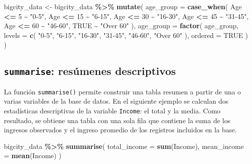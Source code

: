 \documentclass[
  spanish,
  12pt,
]{book}
\newenvironment{Shaded}{\begin{snugshade}}{\end{snugshade}}
\newcommand{\AttributeTok}[1]{\textcolor[rgb]{0.13,0.29,0.53}{#1}}
\newcommand{\ConstantTok}[1]{\textcolor[rgb]{0.56,0.35,0.01}{#1}}
\newcommand{\DecValTok}[1]{\textcolor[rgb]{0.00,0.00,0.81}{#1}}
\newcommand{\FunctionTok}[1]{\textcolor[rgb]{0.13,0.29,0.53}{\textbf{#1}}}
\newcommand{\NormalTok}[1]{#1}
\newcommand{\OtherTok}[1]{\textcolor[rgb]{0.56,0.35,0.01}{#1}}
\newcommand{\SpecialCharTok}[1]{\textcolor[rgb]{0.81,0.36,0.00}{\textbf{#1}}}
\newcommand{\StringTok}[1]{\textcolor[rgb]{0.31,0.60,0.02}{#1}}
\begin{document}
\begin{Shaded}
\begin{Highlighting}[]
\NormalTok{bigcity\_data }\OtherTok{\textless{}{-}}\NormalTok{ bigcity\_data }\SpecialCharTok{\%\textgreater{}\%}
  \FunctionTok{mutate}\NormalTok{(}
    \AttributeTok{age\_group =} \FunctionTok{case\_when}\NormalTok{(}
\NormalTok{      Age }\SpecialCharTok{\textless{}=} \DecValTok{5} \SpecialCharTok{\textasciitilde{}} \StringTok{"0{-}5"}\NormalTok{,}
\NormalTok{      Age }\SpecialCharTok{\textless{}=} \DecValTok{15} \SpecialCharTok{\textasciitilde{}} \StringTok{"6{-}15"}\NormalTok{,}
\NormalTok{      Age }\SpecialCharTok{\textless{}=} \DecValTok{30} \SpecialCharTok{\textasciitilde{}} \StringTok{"16{-}30"}\NormalTok{,}
\NormalTok{      Age }\SpecialCharTok{\textless{}=} \DecValTok{45} \SpecialCharTok{\textasciitilde{}} \StringTok{"31{-}45"}\NormalTok{,}
\NormalTok{      Age }\SpecialCharTok{\textless{}=} \DecValTok{60} \SpecialCharTok{\textasciitilde{}} \StringTok{"46{-}60"}\NormalTok{,}
      \ConstantTok{TRUE} \SpecialCharTok{\textasciitilde{}} \StringTok{"Over 60"}
\NormalTok{    ),}
    \AttributeTok{age\_group =} \FunctionTok{factor}\NormalTok{(}
\NormalTok{      age\_group,}
      \AttributeTok{levels =} \FunctionTok{c}\NormalTok{(}
        \StringTok{"0{-}5"}\NormalTok{, }\StringTok{"6{-}15"}\NormalTok{, }\StringTok{"16{-}30"}\NormalTok{,}
        \StringTok{"31{-}45"}\NormalTok{, }\StringTok{"46{-}60"}\NormalTok{, }\StringTok{"Over 60"}
\NormalTok{      ),}
      \AttributeTok{ordered =} \ConstantTok{TRUE}
\NormalTok{    )}
\NormalTok{  )}
\end{Highlighting}
\end{Shaded}

\subsection{\texorpdfstring{\texttt{summarise}: resúmenes descriptivos}{summarise: resúmenes descriptivos}}\label{summarise-resumenes-descriptivos}

La función \texttt{summarise()} permite construir una tabla resumen a partir de una o varias variables de la base de datos. En el siguiente ejemplo se calculan dos estadísticas descriptivas de la variable \texttt{Income}: el total y la media. Como resultado, se obtiene una tabla con una sola fila que contiene la suma de los ingresos observados y el ingreso promedio de los registros incluidos en la base.

\begin{Shaded}
\begin{Highlighting}[]
\NormalTok{bigcity\_data }\SpecialCharTok{\%\textgreater{}\%}
  \FunctionTok{summarise}\NormalTok{(}
    \AttributeTok{total\_income =} \FunctionTok{sum}\NormalTok{(Income),}
    \AttributeTok{mean\_income =} \FunctionTok{mean}\NormalTok{(Income)}
\NormalTok{  )}
\end{Highlighting}
\end{Shaded}
\end{document}
